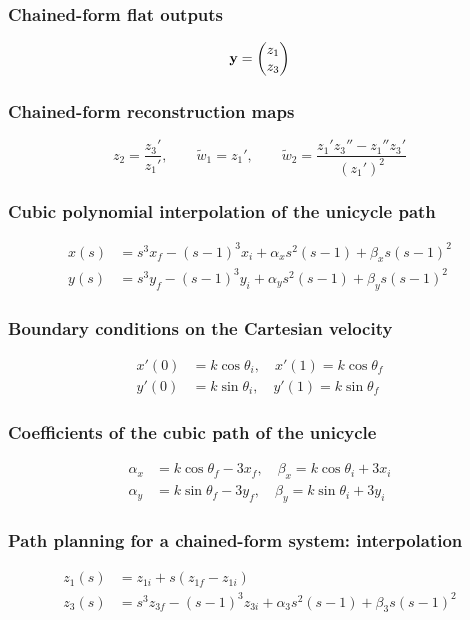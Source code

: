 \subsubsection{Chained-form flat outputs}
\begin{equation*}
    {\mathbf y}=\begin{pmatrix}z_1\\z_3\end{pmatrix}
\end{equation*}

\subsubsection{Chained-form reconstruction maps}
\begin{equation*}
    z_2=\frac{z_3'}{z_1'},\qquad \tilde w_1=z_1',\qquad \tilde w_2=\frac{z_1'z_3''-z_1''z_3'}{(z_1')^2}
\end{equation*}

\subsubsection{Cubic polynomial interpolation of the unicycle path}
\begin{align*}
    x(s)&=s^3x_f-(s-1)^3x_i+\alpha_xs^2(s-1)+\beta_xs(s-1)^2\\
    y(s)&=s^3y_f-(s-1)^3y_i+\alpha_ys^2(s-1)+\beta_ys(s-1)^2
\end{align*}

\subsubsection{Boundary conditions on the Cartesian velocity}
\begin{align*}
    x'(0)&=k\cos\theta_i,\quad x'(1)=k\cos\theta_f\\
    y'(0)&=k\sin\theta_i,\quad y'(1)=k\sin\theta_f
\end{align*}

\subsubsection{Coefficients of the cubic path of the unicycle}
\begin{align*}
    \alpha_x&=k\cos\theta_f-3x_f,\quad \beta_x=k\cos\theta_i+3x_i\\
    \alpha_y&=k\sin\theta_f-3y_f,\quad \beta_y=k\sin\theta_i+3y_i
\end{align*}

\subsubsection{Path planning for a chained-form system: interpolation}
\begin{align*}
    z_1(s)&=z_{1i}+s(z_{1f}-z_{1i})\\
    z_3(s)&=s^3z_{3f}-(s-1)^3z_{3i}+\alpha_3s^2(s-1)+\beta_3s(s-1)^2
\end{align*}

